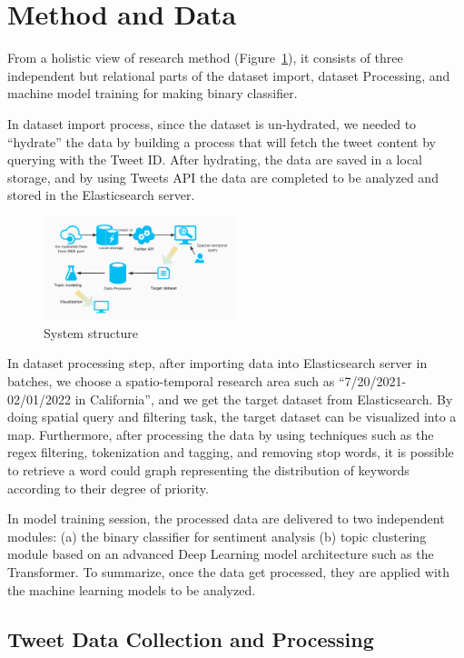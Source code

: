 \section{Method and Data} \label{sec:method_and_data}
From a holistic view of research method (Figure~\ref{fig:Research Method}), it
consists of three independent but relational parts of the dataset import,
dataset Processing, and machine model training for making binary classifier.

In dataset import process, since the dataset is un-hydrated, we needed
to “hydrate” the data by building a process that will fetch the tweet content
by querying with the Tweet ID. After hydrating, the data are saved in a local
storage, and by using Tweets API the data are completed to be analyzed and
stored in the Elasticsearch server. 
\begin{figure}[h]
\centering
\includegraphics[width=0.5\textwidth]{imgs/freamwork.jpg}
\caption{System structure}
\label{fig:Research Method}
\end{figure}
In dataset processing step, after importing data into Elasticsearch server in
batches, we choose a spatio-temporal research area such
as “7/20/2021-02/01/2022 in California”, and we get the target dataset from
Elasticsearch. By doing spatial query and filtering task, the target dataset
can be visualized into a map. Furthermore, after processing the data by using
techniques such as the regex filtering, tokenization and tagging, and
removing stop words, it is possible to retrieve a word could graph
representing the distribution of keywords according to their degree of
priority.

In model training session, the processed data are delivered to two independent
modules: (a) the binary classifier for sentiment analysis (b) topic
clustering module based on an advanced Deep Learning model architecture such
as the Transformer. To summarize, once the data get processed, they are
applied with the machine learning models to be analyzed.

\subsection{Tweet Data Collection and Processing}
